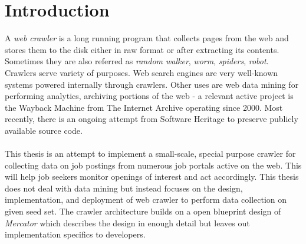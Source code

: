 \chapter{Introduction}
A \textit{web crawler} is a long running program that collects pages from the web and stores them to the
disk either in raw format or after extracting its contents. Sometimes they are also referred as
\textit{random walker}, \textit{worm}, \textit{spiders}, \textit{robot}. Crawlers serve variety of
purposes. Web search engines are very well-known systems powered internally through crawlers.
Other uses are web data mining for performing analytics, archiving portions of the web - a
relevant active project is the Wayback Machine from The Internet Archive\cite{netarchive} operating since 2000. Most recently,
there is an ongoing attempt from Software Heritage\cite{swheritage} to preserve publicly available
source code.
\\
\\
This thesis is an attempt to implement a small-scale, special purpose crawler for collecting data on job postings from
numerous job portals active on the web. This will help job seekers monitor openings of interest and
act accordingly. This thesis does not deal with data mining but instead focuses on the design, implementation, and deployment of web crawler to perform data collection on given seed set. The crawler architecture builds on a open blueprint design of \textit{Mercator}\cite{mercator} which describes the design in enough detail but leaves out implementation specifics to developers.
\\
\\
